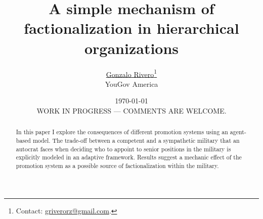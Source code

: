 \documentclass[11pt]{article}
\begin{document}
\title{A simple mechanism of factionalization in hierarchical organizations}

\author{\href{mailto:griverorz@gmail.com}{Gonzalo Rivero}\footnote{Contact:
    \href{mailto:griverorz@gmail.com}{griverorz@gmail.com}.} \\ YouGov America }

\date{\today \\ \vspace*{2cm}  WORK IN PROGRESS --- COMMENTS ARE WELCOME.}

\maketitle


\begin{abstract}
  In this paper I explore the consequences of different promotion systems using
  an agent-based model. The trade-off between a competent and a sympathetic
  military that an autocrat faces when deciding who to appoint to senior
  positions in the military is explicitly modeled in an adaptive framework.
  Results suggest a mechanic effect of the promotion system as a possible source
  of factionalization within the military.
\end{abstract}

\newpage








\newpage



\end{document}
